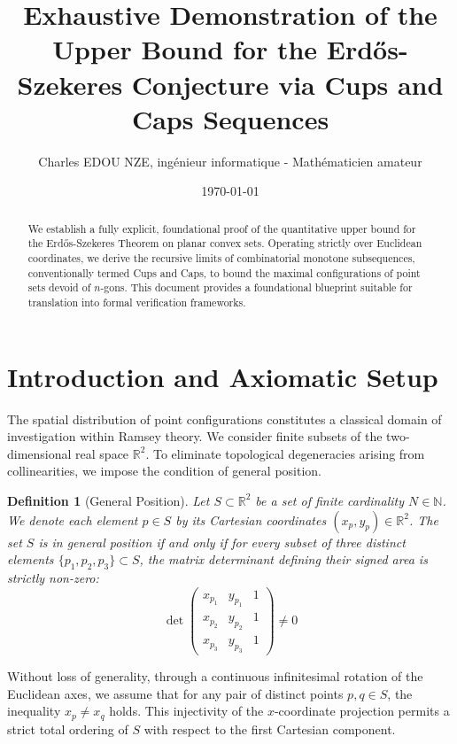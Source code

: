 \documentclass[11pt,a4paper]{article}
\title{Exhaustive Demonstration of the Upper Bound for the Erd\H{o}s-Szekeres Conjecture via Cups and Caps Sequences}
\author{Charles EDOU NZE, ing\'enieur informatique - Math\'ematicien amateur}
\date{\today}
\newtheorem{definition}[theorem]{Definition}
\begin{document}
\maketitle

\begin{abstract}
We establish a fully explicit, foundational proof of the quantitative upper bound for the Erd\H{o}s-Szekeres Theorem on planar convex sets. Operating strictly over Euclidean coordinates, we derive the recursive limits of combinatorial monotone subsequences, conventionally termed Cups and Caps, to bound the maximal configurations of point sets devoid of $n$-gons. This document provides a foundational blueprint suitable for translation into formal verification frameworks.
\end{abstract}

\tableofcontents
\vspace{1cm}

\section{Introduction and Axiomatic Setup}

The spatial distribution of point configurations constitutes a classical domain of investigation within Ramsey theory. We consider finite subsets of the two-dimensional real space $\mathbb{R}^2$. To eliminate topological degeneracies arising from collinearities, we impose the condition of general position.

\begin{definition}[General Position]
Let $S \subset \mathbb{R}^2$ be a set of finite cardinality $N \in \mathbb{N}$. We denote each element $p \in S$ by its Cartesian coordinates $(x_p, y_p) \in \mathbb{R}^2$. The set $S$ is in general position if and only if for every subset of three distinct elements $\{p_1, p_2, p_3\} \subset S$, the matrix determinant defining their signed area is strictly non-zero:
\begin{equation}
\det \begin{pmatrix} x_{p_1} & y_{p_1} & 1 \\ x_{p_2} & y_{p_2} & 1 \\ x_{p_3} & y_{p_3} & 1 \end{pmatrix} \neq 0
\end{equation}
\end{definition}

Without loss of generality, through a continuous infinitesimal rotation of the Euclidean axes, we assume that for any pair of distinct points $p, q \in S$, the inequality $x_p \neq x_q$ holds. This injectivity of the $x$-coordinate projection permits a strict total ordering of $S$ with respect to the first Cartesian component.
\end{document}
